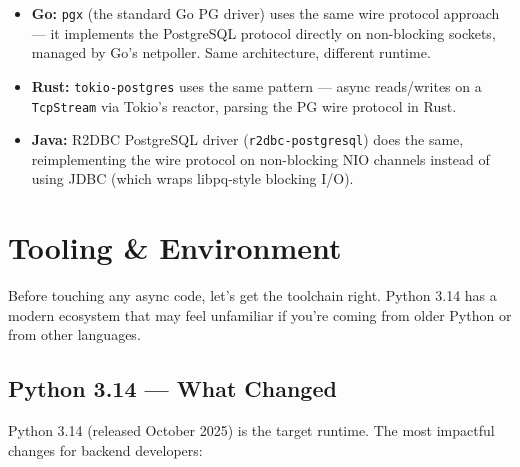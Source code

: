 \documentclass[11pt,a4paper,oneside]{book}
\begin{document}
\begin{analogybox}
\begin{itemize}
    \item \textcolor{goblue}{\textbf{Go:}} \texttt{pgx} (the standard Go PG driver) uses the same
          wire protocol approach --- it implements the PostgreSQL protocol directly on
          non-blocking sockets, managed by Go's netpoller. Same architecture, different runtime.
    \item \textcolor{BrickRed}{\textbf{Rust:}} \texttt{tokio-postgres} uses the same pattern ---
          async reads/writes on a \texttt{TcpStream} via Tokio's reactor, parsing the PG wire
          protocol in Rust.
    \item \textcolor{javaorange}{\textbf{Java:}} R2DBC PostgreSQL driver (\texttt{r2dbc-postgresql})
          does the same, reimplementing the wire protocol on non-blocking NIO channels instead of
          using JDBC (which wraps libpq-style blocking I/O).
\end{itemize}
\end{analogybox}

\chapter{Tooling \& Environment}

Before touching any async code, let's get the toolchain right. Python 3.14 has a modern ecosystem
that may feel unfamiliar if you're coming from older Python or from other languages.

\section{Python 3.14 --- What Changed}

Python 3.14 (released October 2025) is the target runtime. The most impactful changes for backend
developers:
\end{document}

